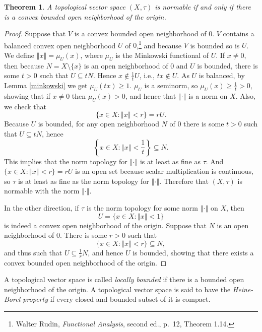 \documentclass{article}
\newcommand{\norm}[1]{\left\Vert #1 \right\Vert}
\newtheorem{theorem}{Theorem}
\begin{document}
\begin{theorem}
A topological vector space $(X,\tau)$ is normable if and only if there is a convex bounded open neighborhood of the origin.
\label{normable}
\end{theorem}
\begin{proof}
Suppose that $V$ is a convex bounded open neighborhood of $0$. $V$ contains a 
balanced convex open neighborhood $U$ of $0$,\footnote{Walter Rudin,
{\em Functional Analysis}, second ed., p.~12, Theorem 1.14.} and because $V$ is bounded so is $U$. We define
$\norm{x}=\mu_U(x)$, where $\mu_U$ is the Minkowski functional of $U$.  If $x \neq 0$,
then because $N=X \setminus \{x\}$ is an open neighborhood of $0$ and $U$ is bounded, there is some $t>0$ such that $U \subseteq tN$. Hence
$x \not \in \frac{1}{t}U$, i.e., $tx \not \in U$. As $U$ is balanced, 
by Lemma \ref{minkowski} we get $\mu_U(tx) \geq 1$. $\mu_U$ is a seminorm, so $\mu_U(x) \geq \frac{1}{t}>0$, showing that if $x \neq 0$ then $\mu_U(x) >0$, and hence
that $\norm{\cdot}$ is a norm on $X$. 
Also, we check that
\[
\{x \in X: \norm{x} < r\} = rU.
\]
Because $U$ is bounded, for any open neighborhood $N$ of $0$ there is some $t>0$ such that $U \subseteq tN$, hence
\[
\left\{x \in X: \norm{x} < \frac{1}{t} \right\} \subseteq N.
\]
This implies that the norm topology for $\norm{\cdot}$ is at least as fine as $\tau$.
And $\{x \in X: \norm{x} < r\}=rU$ is an open set because scalar multiplication is continuous, so $\tau$ is at least as fine as the norm topology for $\norm{\cdot}$. Therefore
that $(X,\tau)$ is normable with the norm $\norm{\cdot}$.

In the other direction, 
if $\tau$ is the norm topology for some norm $\norm{\cdot}$ on $X$, then 
\[
U=\{x \in X: \norm{x} < 1\}
\]
is indeed a convex open neighborhood of the origin. Suppose that $N$ is an open neighborhood of $0$. There is some
$r>0$ such that
\[
\{x \in X: \norm{x}<r\} \subseteq N,
\] 
and thus such that $U \subseteq \frac{1}{r}N$, and hence $U$ is bounded, showing that there exists a convex bounded open neighborhood of the origin.
\end{proof}


A topological vector space is called {\em locally bounded} if there is a bounded open neighborhood of the origin. A topological vector
space is said to have the {\em Heine-Borel property} if every closed and bounded subset of it is compact. 
\end{document}
